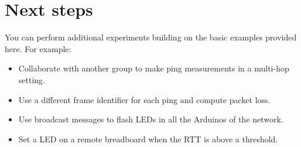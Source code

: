 \section{Next steps}

You can perform additional experiments  building on the basic examples provided here.
For example:
\begin{itemize}
\item Collaborate with another group to make ping measurements in a multi-hop setting.
\item Use a different frame identifier for each ping and compute packet loss.
\item Use broadcast messages to flash LEDs in all the Arduinos of the network.
\item Set a LED on a remote breadboard when the RTT is above a threshold.
\end{itemize}
